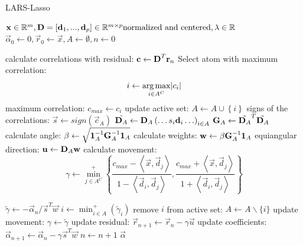 \begin{algorithm}[H]
\caption{LARS-Lasso}
\label{alg:lars}
\begin{algorithmic}[1]
\REQUIRE $\boldsymbol{\mathrm{x}} \in \mathbb{R}^m, \boldsymbol{\mathrm{D}} =[\boldsymbol{\mathrm{d}}_1,...,\boldsymbol{\mathrm{d}}_p] \in
\mathbb{R}^{m\times p} \text{normalized and centered},\lambda \in \mathbb{R}$
\STATE $\vec{\alpha}_0 \gets 0, \vec{r}_0 \gets \vec{x}, A \gets \emptyset, n
\gets 0$

\STATE calculate correlations with residual: $\boldsymbol{\mathrm{c}} \gets
\boldsymbol{\mathrm{D}}^T\boldsymbol{\mathrm{r}}_n$
\STATE Select atom with maximum correlation: 
\begin{equation*}
i \gets \argmax_{i \in A^C} \lvert c_i  \rvert %
\end{equation*}
\STATE maximum correlation: $c_{max} \gets c_i $ %
\STATE update active set: $A \gets A \cup \left\{i\right\} $
\STATE{}
\STATE signs of the correlations: $\vec{s} \gets  sign\left(\vec{c}_A\right)$
\STATE $\tilde{\boldsymbol{\mathrm{D}}_A} \gets \boldsymbol{\mathrm{D}}_A\left(\ldots s_i\boldsymbol{\mathrm{d}}_i
\ldots\right)_{i\in A}$
\STATE $\boldsymbol{\mathrm{G}}_A \gets \tilde{\boldsymbol{\mathrm{D}}_A}^T\tilde{\boldsymbol{\mathrm{D}}_A}$
\STATE calculate angle: $\beta \gets \sqrt{ \boldsymbol{\mathrm{1}}_A^{-1} \boldsymbol{\mathrm{G}}_A^{-1}
\boldsymbol{\mathrm{1}}_A
}$
\STATE calculate weights: $\boldsymbol{\mathrm{w}} \gets \beta\boldsymbol{\mathrm{G}}_A^{-1}\boldsymbol{\mathrm{1}}_A$
\STATE equiangular direction: $\boldsymbol{\mathrm{u}} \gets \boldsymbol{\mathrm{D}}_A\boldsymbol{\mathrm{w}}$
\STATE calculate movement:
\begin{equation*}
\gamma \gets \min_{j\in A^C}^{+} \left\lbrace \frac{c_{max}-\left<
\vec{x},\vec{d}_j \right> }{1-\left< \vec{d}_i,\vec{d}_j \right> },
\frac{c_{max}+\left< \vec{x},\vec{d}_j \right>}{1+\left< \vec{d}_i,\vec{d}_j
\right> } \right\rbrace
\end{equation*}

\STATE $ \tilde{\gamma} \gets -\vec{\alpha}_n/\vec{s}^T\vec{w}  $
\STATE $ i \gets \min_{i\in A}^{+} \left( \tilde{\gamma}_i \right) $
\STATE remove $i$ from active  set: $ A \gets A \backslash \{i\} $
\STATE update movement: $ \gamma \gets \tilde{\gamma} $  
\ENDIF
\ENDIF
\STATE update residual: $ \vec{r}_{n+1} \gets \vec{r}_{n} - \gamma \vec{u}
$
\STATE update coefficients: $ \vec{\alpha}_{n+1} \gets \vec{\alpha}_n - \gamma
\vec{s}^T\vec{w} $
\STATE $n \gets n + 1$ 
\ENDWHILE
\RETURN $\vec{\alpha}$
\end{algorithmic}
\end{algorithm}



